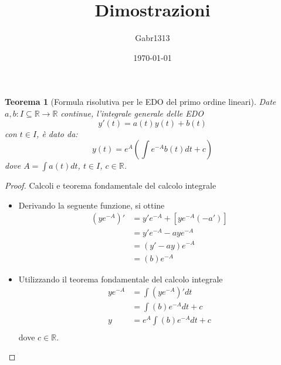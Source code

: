 \documentclass[12pt, a4paper]{article}
\title{Dimostrazioni}
\author{Gabr1313}
\date{\today}
\theoremstyle{break}
\newtheorem{theorem}{Teorema} %
\begin{document}
\justify
\sloppy
\maketitle
\listoftheorems

\newpage
{}

\begin{theorem} [Formula risolutiva per le EDO del primo ordine lineari]
	Date $a, b: I \subseteq \mathbb{R} \to \mathbb{R}$ continue,
	l'integrale generale delle EDO
	\[
		y'(t) = a(t) y(t) + b(t)
	\]
	con $t \in I $, è dato da:
	\[
		y(t) = e^A \left( \int e^{-A} b(t) dt + c \right)
	\]
	dove $A = \int a(t) dt$, $t \in I$, $c \in \mathbb{R}$.
\end{theorem}
\begin{proof} Calcoli e teorema fondamentale del calcolo integrale
	\begin{itemize}
		\item Derivando la seguente funzione, si ottine
			\begin{align*}
				(y e^{-A})' & = y' e^{-A} + [ye^{-A}(-a')] \\
				            & = y' e^{-A} - aye^{-A}       \\
				            & = (y' - ay)e^{-A}            \\
				            & = (b)e^{-A}
			\end{align*}
		\item Utilizzando il teorema fondamentale del calcolo integrale
			\begin{align*}
				y e^{-A} & = \int (y e^{-A})' dt       \\
				         & = \int (b)e^{-A} dt + c     \\
				y        & = e^A \int (b)e^{-A} dt + c \\
			\end{align*}
			dove $c \in \mathbb{R}$.
	\end{itemize}
\end{proof}
\end{document}
